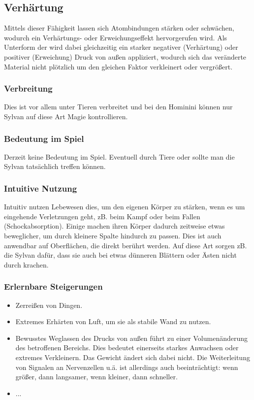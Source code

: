 \subsection{Verhärtung}\label{sec:haertungsmagie}
Mittels dieser Fähigkeit lassen sich Atombindungen stärken oder schwächen, wodurch ein Verhärtungs- oder Erweichungseffekt hervorgerufen wird. Als Unterform der  wird dabei gleichzeitig ein starker negativer (Verhärtung) oder positiver (Erweichung) Druck von außen appliziert, wodurch sich das veränderte Material nicht plötzlich um den gleichen Faktor verkleinert oder vergrößert.

\subsubsection{Verbreitung}
Dies ist vor allem unter Tieren verbreitet und bei den Hominini können nur Sylvan auf diese Art Magie kontrollieren.

\subsubsection{Bedeutung im Spiel}
Derzeit keine Bedeutung im Spiel. Eventuell durch Tiere oder sollte man die Sylvan tatsächlich treffen können.

\subsubsection{Intuitive Nutzung}
Intuitiv nutzen Lebewesen dies, um den eigenen Körper zu stärken, wenn es um eingehende Verletzungen geht, zB. beim Kampf oder beim Fallen (Schockabsorption). Einige machen ihren Körper dadurch zeitweise etwas beweglicher, um durch kleinere Spalte hindurch zu passen. Dies ist auch anwendbar auf Oberflächen, die direkt berührt werden. Auf diese Art sorgen zB. die Sylvan dafür, dass sie auch bei etwas dünneren Blättern oder Ästen nicht durch krachen.

\subsubsection{Erlernbare Steigerungen}
\begin{itemize}
	\item Zerreißen von Dingen.
	\item Extremes Erhärten von Luft, um sie als stabile Wand zu nutzen.
	\item Bewusstes Weglassen des Drucks von außen führt zu einer Volumenänderung des betroffenen Bereichs. Dies bedeutet einerseits starkes Anwachsen oder extremes Verkleinern. Das Gewicht ändert sich dabei nicht. Die Weiterleitung von Signalen an Nervenzellen u.ä. ist allerdings auch beeinträchtigt: wenn größer, dann langsamer, wenn kleiner, dann schneller.
	\item ...
\end{itemize}

